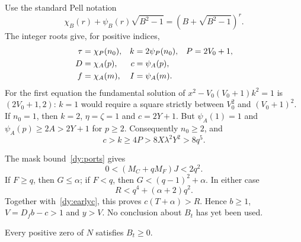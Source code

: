 Use the standard Pell notation
\[
 \chi_B(r)+\psi_B(r)\sqrt{B^2-1}
       =(B+\sqrt{B^2-1})^r.
\]
The integer roots give, for positive indices,
\begin{align}
 \tau&=\chi_P(n_0),&k&=2\psi_P(n_0),&P&=2V_0+1,\notag\\
 D&=\chi_A(p),&c&=\psi_A(p),\notag\\
 f&=\chi_A(m),&I&=\psi_A(m).
 \label{dy:pellindices}
\end{align}
For the first equation the fundamental solution of
$x^2-V_0(V_0+1)k^2=1$ is $(2V_0+1,2)$: $k=1$ would require a square
strictly between $V_0^2$ and $(V_0+1)^2$.
If $n_0=1$, then $k=2$, $\eta=\zeta=1$ and $c=2Y+1$.
But $\psi_A(1)=1$ and $\psi_A(p)\ge2A>2Y+1$ for $p\ge2$.
Consequently $n_0\ge2$, and
\begin{equation}
 c>k\ge4P>8X\lambda^2Y^2>8q^5.
 \label{dy:earlyc}
\end{equation}

The mask bound~\eqref{dy:ports} gives
\[
 0<(M_C+qM_F)J<2q^2.
\]
If $F\ge q$, then $G\le\alpha$; if $F<q$, then
$G<(q-1)^2+\alpha$.  In either case
\begin{equation}
 R<q^4+(\alpha+2)q^2.
 \label{dy:Ronesided}
\end{equation}
Together with~\eqref{dy:earlyc}, this proves $c(T+\alpha)>R$.
Hence $b\ge1$, $V=D_fb-c>1$ and $y>V$.
No conclusion about $B_t$ has yet been used.

\begin{lemma}
\label{dy:transport}
Every positive zero of $N$ satisfies $B_t\ge0$.
\end{lemma}


